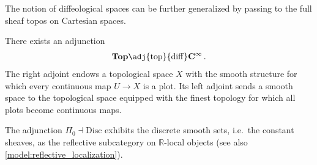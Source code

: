     The notion of diffeological spaces can be further generalized by passing to the full sheaf topos on Cartesian spaces.

    \begin{property}
        There exists an adjunction
        \begin{gather}
            \mathbf{Top}\adj{\mathrm{top}}{\mathrm{diff}}\mathbf{C^\infty}\,.
        \end{gather}
        The right adjoint endows a topological space $X$ with the smooth structure for which every continuous map $U\rightarrow X$ is a plot. Its left adjoint sends a smooth space to the topological space equipped with the finest topology for which all plots become continuous maps.
    \end{property}

    \begin{property}\label{topos:discrete_smooth_sets}
        The adjunction $\Pi_0\dashv\mathrm{Disc}$ exhibits the discrete smooth sets, i.e.~the constant sheaves, as the reflective subcategory on $\mathbb{R}$-local objects (see also \cref{model:reflective_localization}).
    \end{property}

